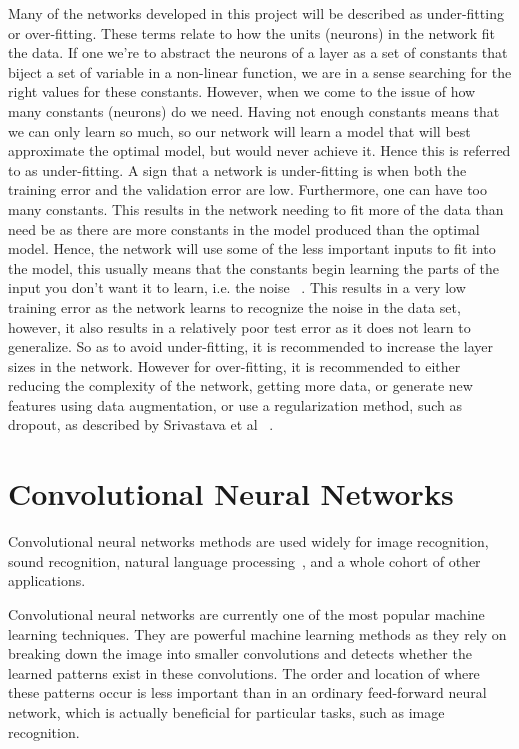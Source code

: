 \documentclass[12pt,a4paper,oneside,oldfontcommands]{memoir}
\begin{document}
\begin{Declaration Of OriginalityOrginality}
Many of the networks developed in this project will be described as under-fitting or over-fitting. These terms relate to how the units (neurons) in the network fit the data. If one we're to abstract the neurons of a layer as a set of constants that biject a set of variable in a non-linear function, we are in a sense searching for the right values for these constants. However, when we come to the issue of how many constants (neurons) do we need. Having not enough constants means that we can only learn so much, so our network will learn a model that will best approximate the optimal model, but would never achieve it. Hence this is referred to as under-fitting. A sign that a network is under-fitting is when both the training error and the validation error are low. Furthermore, one can have too many constants. This results in the network needing to fit more of the data than need be as there are more constants in the model produced than the optimal model. Hence, the network will use some of the less important inputs to fit into the model, this usually means that the constants begin learning the parts of the input you don't want it to learn, i.e. the noise ~\cite{dgb}. This results in a very low training error as the network learns to recognize the noise in the data set, however, it also results in a relatively poor test error as it does not learn to generalize. So as to avoid under-fitting, it is recommended to increase the layer sizes in the network. However for over-fitting, it is recommended to either reducing the complexity of the network, getting more data, or generate new features using data augmentation, or use a regularization method, such as dropout, as described by Srivastava et al ~\cite{dropout}.

\section{Convolutional Neural Networks}

Convolutional neural networks methods are used widely for image recognition, sound recognition, natural language processing~\cite{Bhandare}, and a whole cohort of other applications.

Convolutional neural networks are currently one of the most popular machine learning techniques. They are powerful machine learning methods as they rely on breaking down the image into smaller convolutions and detects whether the learned patterns exist in these convolutions. The order and location of where these patterns occur is less important than in an ordinary feed-forward neural network, which is actually beneficial for particular tasks, such as image recognition.


\end{Declaration Of OriginalityOrginality}
\end{document}
